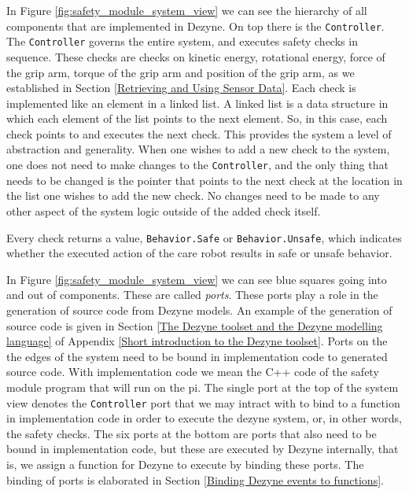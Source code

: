 \documentclass[12pt]{scrreprt}
\begin{document}
\par
In Figure \ref{fig:safety_module_system_view} we can see the hierarchy of all components that are implemented in Dezyne. On top there is the \texttt{Controller}. The \texttt{Controller} governs the entire system, and executes safety checks in sequence. These checks are checks on kinetic energy, rotational energy, force of the grip arm, torque of the grip arm and position of the grip arm, as we established in Section \ref{Retrieving and Using Sensor Data}. Each check is implemented like an element in a linked list. A linked list is a data structure in which each element of the list points to the next element. So, in this case, each check points to and executes the next check. This provides the system a level of abstraction and generality. When one wishes to add a new check to the system, one does not need to make changes to the \texttt{Controller}, and the only thing that needs to be changed is the pointer that points to the next check at the location in the list one wishes to add the new check. No changes need to be made to any other aspect of the system logic outside of the added check itself.
\par
Every check returns a value, \texttt{Behavior.Safe} or \texttt{Behavior.Unsafe}, which indicates whether the executed action of the care robot results in safe or unsafe behavior. 
\par
In Figure \ref{fig:safety_module_system_view} we can see blue squares going into and out of components. These are called \textit{ports}. These ports play a role in the generation of source code from Dezyne models. An example of the generation of source code is given in Section \ref{The Dezyne toolset and the Dezyne modelling language} of Appendix \ref{Short introduction to the Dezyne toolset}. Ports on the the edges of the system need to be bound in implementation code to generated source code. With implementation code we mean the C++ code of the safety module program that will run on the \gls{pi}. The single port at the top of the system view denotes the \texttt{Controller} port that we may intract with to bind to a function in implementation code in order to execute the dezyne system, or, in other words, the safety checks. The six ports at the bottom are ports that also need to be bound in implementation code, but these are executed by Dezyne internally, that is, we assign a function for Dezyne to execute by binding these ports. The binding of ports is elaborated in Section \ref{Binding Dezyne events to functions}.
\end{document}
